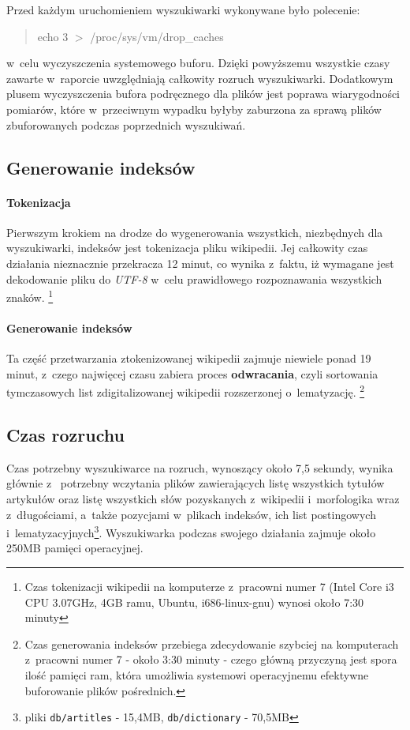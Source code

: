 \documentclass[a4paper,12pt]{article}
\begin{document}
Przed każdym uruchomieniem wyszukiwarki wykonywane było polecenie:
\begin{quote}
	echo 3 $>$ /proc/sys/vm/drop\_caches
\end{quote}
w~celu wyczyszczenia systemowego buforu. Dzięki powyższemu wszystkie czasy zawarte
w~raporcie uwzględniają całkowity rozruch wyszukiwarki. Dodatkowym plusem
wyczyszczenia bufora podręcznego dla plików jest poprawa wiarygodności
pomiarów, które w~przeciwnym wypadku byłyby zaburzona za sprawą plików
zbuforowanych podczas poprzednich wyszukiwań.

\subsection{Generowanie indeksów}

\paragraph{Tokenizacja}
Pierwszym krokiem na drodze do wygenerowania wszystkich, niezbędnych dla
wyszukiwarki, indeksów jest tokenizacja pliku wikipedii. Jej całkowity czas
działania nieznacznie przekracza 12 minut, co wynika z~faktu, iż wymagane jest
dekodowanie pliku do \textit{UTF-8} w~celu prawidłowego rozpoznawania
wszystkich znaków.
\footnote{Czas tokenizacji wikipedii na komputerze z~pracowni numer 7 (Intel
Core i3 CPU 3.07GHz, 4GB ramu, Ubuntu, i686-linux-gnu) wynosi około 7:30
minuty}

\paragraph{Generowanie indeksów}
Ta część przetwarzania ztokenizowanej wikipedii zajmuje niewiele ponad 19
minut, z~czego najwięcej czasu zabiera proces \textbf{odwracania}, czyli
sortowania tymczasowych list zdigitalizowanej wikipedii rozszerzonej
o~lematyzację.
\footnote{Czas generowania indeksów przebiega zdecydowanie szybciej na
komputerach z~pracowni numer 7 - około 3:30 minuty - czego główną przyczyną
jest spora ilość pamięci ram, która umożliwia systemowi operacyjnemu efektywne
buforowanie plików pośrednich.}

\subsection{Czas rozruchu}

Czas potrzebny wyszukiwarce na rozruch, wynoszący około 7,5 sekundy, wynika
głównie z~ potrzebny wczytania plików zawierających listę wszystkich tytułów
artykułów oraz listę wszystkich słów pozyskanych z~wikipedii i~morfologika wraz
z~długościami, a~także pozycjami w~plikach indeksów, ich list postingowych
i~lematyzacyjnych\footnote{pliki \texttt{db/artitles} - 15,4MB,
\texttt{db/dictionary} - 70,5MB}.
Wyszukiwarka podczas swojego działania zajmuje około 250MB pamięci
operacyjnej.
\end{document}
